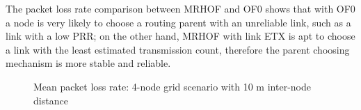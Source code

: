 The packet loss rate comparison between MRHOF and OF0 shows that with OF0 a node is very likely to choose a routing parent with an unreliable link, such as a link with a low PRR; on the other hand, MRHOF with link ETX is apt to choose a link with the least estimated transmission count, therefore the parent choosing mechanism is more stable and reliable.

\begin{figure}[p]
  \centering
    \leavevmode
   \caption{Mean packet loss rate: 4-node grid scenario with 10 m inter-node distance}
   \label{fig:pl_4_grid_10}
    \vspace{-20pt}
\end{figure}

